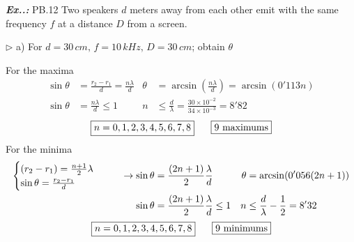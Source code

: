 \documentclass[a4paper]{article}
\begin{document}

\newpage
{}\vspace{2ex}\textbf{\textit{Ex.\thesection.\theex: }}PB.12 Two speakers $d$ meters away from each other emit with the same frequency $f$ at a distance $D$ from a screen.

$\triangleright$ a) For $d=30\,cm,\, f=10\,kHz,\, D=30\,cm$; obtain $\theta$ 

For the maxima
\begin{align}
\sin \theta&=\frac{r_{2}-r_{1}}{d}=\frac{n\lambda}{d} & \theta & =\arcsin\left( \frac{n\lambda}{d} \right)=\arcsin(0'113n) \\
\sin \theta & =\frac{n\lambda}{d}\leq 1 & n & \leq \frac{d}{\lambda}=\frac{30\times 10^{-2}}{34\times 10^{-3}}=8'82
\end{align}
$$
\boxed{n=0,1,2,3,4,5,6,7,8}\hspace{4ex}\boxed{9\text{ maximums}}
$$
For the minima
\begin{align}
\begin{cases}
(r_{2}-r_{1})=\frac{n+1}{2}\lambda \\
\sin \theta=\frac{r_{2}-r_{1}}{d}
\end{cases}\hspace{4ex}\to \sin \theta & =\frac{(2n+1)}{2} \frac{\lambda}{d} & \theta&=\arcsin(0'056(2n+1)) \\
\sin \theta & =\frac{(2n+1)}{2} \frac{\lambda}{d}\leq 1 & n & \leq \frac{d}{\lambda}-\frac{1}{2}=8'32
\end{align}
$$
\boxed{n=0,1,2,3,4,5,6,7,8}\hspace{4ex}\boxed{9\text{ minimums}}
$$
\end{document}
